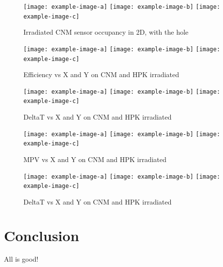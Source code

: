 \documentclass[preprint,1p]{elsarticle}
\begin{document}
\begin{figure}[htbp] 
\centering
\texttt{[image: example-image-a]} 
\texttt{[image: example-image-b]} 
\texttt{[image: example-image-c]} 
\caption{Irradiated CNM sensor occupancy in 2D, with the hole} 
\label{fig:Sensors} 
\end{figure} 

\begin{figure}[htbp] 
\centering
\texttt{[image: example-image-a]} 
\texttt{[image: example-image-b]} 
\texttt{[image: example-image-c]} 
\caption{Efficiency vs X and Y on CNM and HPK irradiated} 
\label{fig:Sensors} 
\end{figure} 

\begin{figure}[htbp] 
\centering
\texttt{[image: example-image-a]} 
\texttt{[image: example-image-b]} 
\texttt{[image: example-image-c]} 
\caption{DeltaT vs X and Y on CNM and HPK irradiated} 
\label{fig:Sensors} 
\end{figure} 

\begin{figure}[htbp] 
\centering
\texttt{[image: example-image-a]} 
\texttt{[image: example-image-b]} 
\texttt{[image: example-image-c]} 
\caption{MPV vs X and Y on CNM and HPK irradiated} 
\label{fig:Sensors} 
\end{figure}


\begin{figure}[htbp] 
\centering
\texttt{[image: example-image-a]} 
\texttt{[image: example-image-b]} 
\texttt{[image: example-image-c]} 
\caption{DeltaT vs X and Y on CNM and HPK irradiated} 
\label{fig:Sensors} 
\end{figure} 
 


\section{Conclusion}
\label{sec:conclusion} 

All is good!





{}
 




\end{document}
